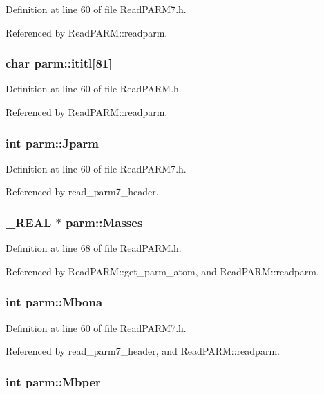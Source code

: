 Definition at line 60 of file Read\-PARM7.h.

Referenced by Read\-PARM::readparm.
\subsubsection{\setlength{\rightskip}{0pt plus 5cm}char parm::ititl[81]}\label{structparm_m0}




Definition at line 60 of file Read\-PARM.h.

Referenced by Read\-PARM::readparm.
\subsubsection{\setlength{\rightskip}{0pt plus 5cm}int parm::Jparm}\label{structparm_m91}




Definition at line 60 of file Read\-PARM7.h.

Referenced by read\_\-parm7\_\-header.
\subsubsection{\setlength{\rightskip}{0pt plus 5cm}\_\-REAL $\ast$ parm::Masses}\label{structparm_m37}




Definition at line 68 of file Read\-PARM.h.

Referenced by Read\-PARM::get\_\-parm\_\-atom, and Read\-PARM::readparm.
\subsubsection{\setlength{\rightskip}{0pt plus 5cm}int parm::Mbona}\label{structparm_m7}




Definition at line 60 of file Read\-PARM7.h.

Referenced by read\_\-parm7\_\-header, and Read\-PARM::readparm.
\subsubsection{\setlength{\rightskip}{0pt plus 5cm}int parm::Mbper}\label{structparm_m96}




